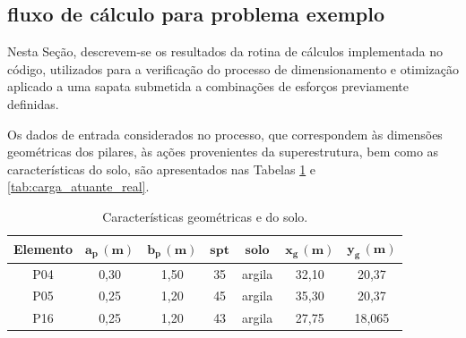 \begin{table}[H]
\centering
\caption{Métricas de desempenho dos modelos GPR para diferentes divisões treino/teste.}
\label{tab:metricas_gpr_toy_problem_all_splits}
\end{table}



\subsection{fluxo de cálculo para problema exemplo}\label{sec:problema_brinquedo}

Nesta Seção, descrevem-se os resultados da rotina de cálculos implementada no código, utilizados para a verificação do processo de dimensionamento e otimização aplicado a uma sapata submetida a combinações de esforços previamente definidas.

Os dados de entrada considerados no processo, que correspondem às dimensões geométricas dos pilares, às ações provenientes da superestrutura, bem como as características do solo, são apresentados nas Tabelas \ref{tab:valores_geometricos_reais} e \ref{tab:carga_atuante_real}.

\begin{table}[htbp!]
\centering
\caption{Características geométricas e do solo.}
\label{tab:valores_geometricos_reais}
\setlength{\tabcolsep}{5pt}
\begin{tabular}{ c c c c c c c}
\toprule
\textbf{Elemento} &
$\mathbf{a_p \, (m)}$ &
$\mathbf{b_p \, (m)}$ &
$\mathbf{spt}$ &
$\mathbf{solo}$ &
$\mathbf{x_g \, (m)}$ &
$\mathbf{y_g \, (m)}$\\
\midrule
P04 & 0,30 & 1,50 & 35 & argila & 32,10 & 20,37 \\
P05 & 0,25 & 1,20 & 45 & argila & 35,30 & 20,37 \\
P16 & 0,25 & 1,20 & 43 & argila & 27,75 & 18,065 \\
\bottomrule
\end{tabular}
\end{table}


